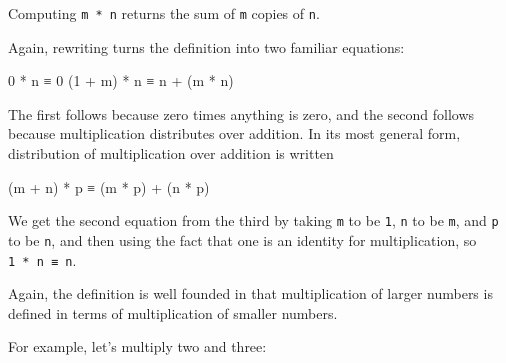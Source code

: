 Computing \texttt{m\ *\ n} returns the sum of \texttt{m} copies of
\texttt{n}.

Again, rewriting turns the definition into two familiar equations:

\begin{myDisplay}
0       * n  ≡  0
(1 + m) * n  ≡  n + (m * n)
\end{myDisplay}

The first follows because zero times anything is zero, and the second
follows because multiplication distributes over addition. In its most
general form, distribution of multiplication over addition is written

\begin{myDisplay}
(m + n) * p  ≡  (m * p) + (n * p)
\end{myDisplay}

We get the second equation from the third by taking \texttt{m} to be
\texttt{1}, \texttt{n} to be \texttt{m}, and \texttt{p} to be
\texttt{n}, and then using the fact that one is an identity for
multiplication, so \texttt{1\ *\ n\ ≡\ n}.

Again, the definition is well founded in that multiplication of larger
numbers is defined in terms of multiplication of smaller numbers.

For example, let's multiply two and three:

